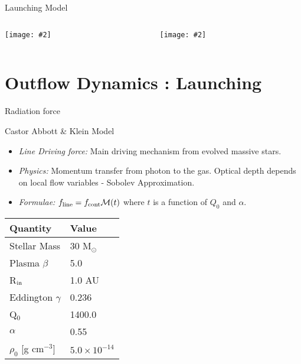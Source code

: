 \documentclass[8pt,xcolor=dvipsnames]{beamer}
\newcommand{\jlfigpath}{/Users/bhargavvaidya/THESIS/chapter3/figures/}
\newcommand{\spic}[2]{\texttt{[image: \#2]}}
\begin{document}
\begin{frame}{Launching Model}
\begin{columns}
\begin{column}{0.45\textwidth}{\textit{\color{red}{Cartoon Model}}}
\spic{0.2}{\jlfigpath/f1.pdf}
\end{column}
\hspace{0.05\textwidth}
\begin{column}{0.45\textwidth}{\textit{\color{red}{Simulation Box}}}
\spic{0.3}{\jlfigpath/f2.pdf}
\end{column}

\end{columns}
\end{frame}


\section{Outflow Dynamics : Launching}
\begin{frame}{Radiation force}
\begin{block}{Castor Abbott \& Klein Model}
\begin{itemize}
\item \textit{Line Driving force:} Main driving mechanism from evolved
  massive stars.
\item \textit{Physics:} Momentum transfer from photon to the gas. 
  Optical depth depends on local flow variables - Sobolev Approximation.
\item \textit{Formulae:} $f_{\rm line} = f_{\rm cont} \mathcal{M}(t)$
where $t$ is a function of $Q_0$ and $\alpha$.
\end{itemize}
\end{block}
\begin{center}
\begin{tabular}{l l}
\hline
Quantity & Value\\
\hline\hline
Stellar Mass & 30 M$_{\odot}$\\
Plasma $\beta$ & 5.0\\
R$_{\rm in}$ & 1.0 AU \\
Eddington $\gamma$ & 0.236 \\
Q$_0$ & 1400.0 \\
$\alpha$ & 0.55 \\
$\rho_0$ [g cm$^{-3}$] & $5.0\times10^{-14}$\\
\hline
\end{tabular}
\end{center}

\end{frame}
\end{document}
